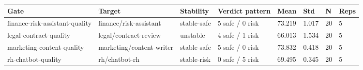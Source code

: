 \begin{tabular}{p{3.1cm} p{2.5cm} p{1.5cm} p{1.8cm} p{1.0cm} p{1.0cm} p{0.8cm} p{0.9cm}}
\toprule
Gate & Target & Stability & Verdict pattern & Mean & Std & N & Reps \\
\midrule
finance-risk-assistant-quality & finance/risk-assistant & stable-safe & 5 safe / 0 risk & 73.219 & 1.017 & 20 & 5 \\
legal-contract-quality & legal/contract-review & unstable & 4 safe / 1 risk & 66.013 & 1.534 & 20 & 5 \\
marketing-content-quality & marketing/content-writer & stable-safe & 5 safe / 0 risk & 73.832 & 0.418 & 20 & 5 \\
rh-chatbot-quality & rh/chatbot-rh & stable-risk & 0 safe / 5 risk & 69.495 & 0.345 & 20 & 5 \\
\bottomrule
\end{tabular}
